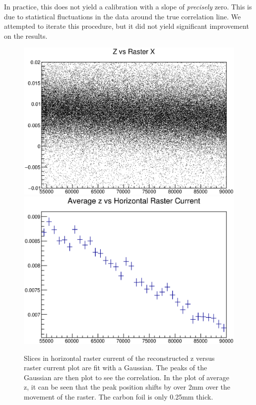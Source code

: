 In practice, this does not yield a calibration with a slope of \textit{precisely} zero. This is due to statistical fluctuations in the data around the true correlation line. We attempted to iterate this procedure, but it did not yield significant improvement on the results.

\begin{figure}
	\includegraphics[width=\textwidth]{./analysis/fig/old1_zvx.eps}
	\includegraphics[width=\textwidth]{./analysis/fig/old1_avgz_nofit.eps}
	\caption{Slices in horizontal raster current of the reconstructed z versus raster current plot are fit with a Gaussian. The peaks of the Gaussian are then plot to see the correlation. In the plot of average z, it can be seen that the peak position shifts by over 2mm over the movement of the raster. The carbon foil is only 0.25mm thick.}
\end{figure}

